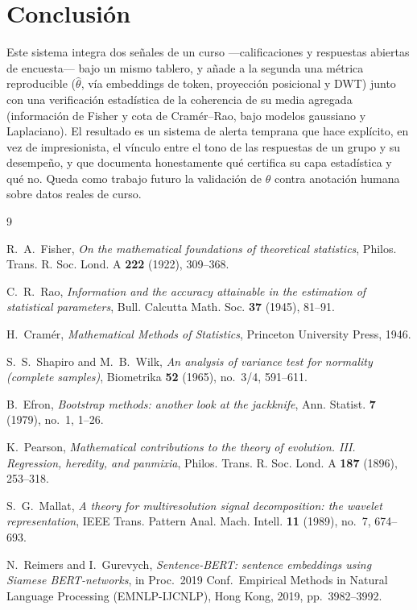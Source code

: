 \documentclass[11pt,a4paper,oneside]{article}
\theoremstyle{definition}
\begin{document}
\section{Conclusión}

Este sistema integra dos señales de un curso —calificaciones y respuestas abiertas de
encuesta— bajo un mismo tablero, y añade a la segunda una métrica reproducible ($\hat\theta$,
vía embeddings de token, proyección posicional y DWT) junto con una verificación estadística de
la coherencia de su media agregada (información de Fisher y cota de Cramér--Rao, bajo modelos
gaussiano y Laplaciano). El resultado es un sistema de alerta temprana que hace explícito, en
vez de impresionista, el vínculo entre el tono de las respuestas de un grupo y su desempeño, y
que documenta honestamente qué certifica su capa estadística y qué no. Queda como trabajo futuro
la validación de $\hat\theta$ contra anotación humana sobre datos reales de curso.

\begin{thebibliography}{9}

 R.~A.~Fisher, \emph{On the mathematical foundations of theoretical
statistics}, Philos. Trans. R. Soc. Lond. A \textbf{222} (1922), 309--368.

 C.~R.~Rao, \emph{Information and the accuracy attainable in the estimation of
statistical parameters}, Bull. Calcutta Math. Soc. \textbf{37} (1945), 81--91.

 H.~Cram\'er, \emph{Mathematical Methods of Statistics}, Princeton University
Press, 1946.

 S.~S.~Shapiro and M.~B.~Wilk, \emph{An analysis of variance test for
normality (complete samples)}, Biometrika \textbf{52} (1965), no.~3/4, 591--611.

 B.~Efron, \emph{Bootstrap methods: another look at the jackknife}, Ann.
Statist. \textbf{7} (1979), no.~1, 1--26.

 K.~Pearson, \emph{Mathematical contributions to the theory of evolution.
III. Regression, heredity, and panmixia}, Philos. Trans. R. Soc. Lond. A \textbf{187} (1896),
253--318.

 S.~G.~Mallat, \emph{A theory for multiresolution signal decomposition: the
wavelet representation}, IEEE Trans. Pattern Anal. Mach. Intell. \textbf{11} (1989), no.~7,
674--693.

 N.~Reimers and I.~Gurevych, \emph{Sentence-BERT: sentence
embeddings using Siamese BERT-networks}, in Proc.\ 2019 Conf.\ Empirical Methods in Natural
Language Processing (EMNLP-IJCNLP), Hong Kong, 2019, pp.~3982--3992.

\end{thebibliography}
\end{document}
